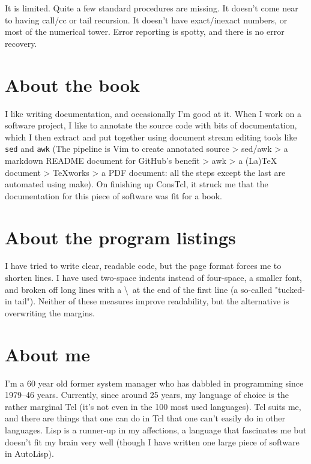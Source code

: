 \documentclass[twoside,9pt]{report}
\begin{document}
It is limited. Quite a few standard procedures are missing. It doesn't come near to having call/cc or tail recursion. It doesn't have exact/inexact numbers, or most of the numerical tower. Error reporting is spotty, and there is no error recovery.

\section{About the book}
\label{about-the-book}

I like writing documentation, and occasionally I'm good at it. When I work on a software project, I like to annotate the source code with bits of documentation, which I then extract and put together using document stream editing tools like \texttt{sed} and \texttt{awk} (The pipeline is Vim to create annotated source > sed/awk > a markdown README document for GitHub's benefit > awk > a (La)TeX document > TeXworks > a PDF document: all the steps except the last are automated using make). On finishing up ConsTcl, it struck me that the documentation for this piece of software was fit for a book.

\section{About the program listings}
\label{about-the-program-listings}

I have tried to write clear, readable code, but the page format forces me to shorten lines. I have used two-space indents instead of four-space, a smaller font, and broken off long lines with a \textbackslash\  at the end of the first line (a so-called "tucked-in tail"). Neither of these measures improve readability, but the alternative is overwriting the margins.

\section{About me}
\label{about-me}

I'm a 60 year old former system manager who has dabbled in programming since 1979--46 years. Currently, since around 25 years, my language of choice is the rather marginal Tcl (it's not even in the 100 most used languages). Tcl suits me, and there are things that one can do in Tcl that one can't easily do in other languages. Lisp is a runner-up in my affections, a language that fascinates me but doesn't fit my brain very well (though I have written one large piece of software in AutoLisp).
\end{document}
